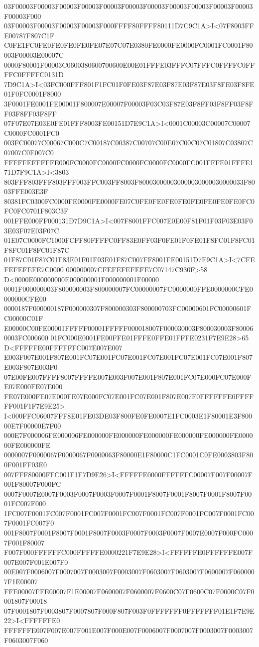 03F00003F00003F00003F00003F00003F00003F00003F00003F00003F00003F00003F00003F000
03F00003F00003F00003F00003F000FFFF80FFFF80111D7C9C1A>I<07F8003FFE00787F807C1F
C0FE1FC0FE0FE0FE0FE0FE07E07C07E0380FE0000FE0000FC0001FC0001F80003F00003E00007C
0000F80001F00003C0600380600700600E00E01FFFE03FFFC07FFFC0FFFFC0FFFFC0FFFFC0131D
7D9C1A>I<03FC000FFF801F1FC01F0FE03F87E03F87E03F87E03F8FE03F8FE01F0FC0001F8000
3F0001FE0001FE00001F800007E00007F00003F03C03F87E03F8FF03F8FF03F8FF03F8FF03F8FF
07F07E07E03E0FE01FFF8003FE00151D7E9C1A>I<0001C00003C00007C00007C0000FC0001FC0
003FC00077C00067C000C7C00187C00387C00707C00E07C00C07C01807C03807C07007C0E007C0
FFFFFEFFFFFE000FC0000FC0000FC0000FC0000FC0000FC001FFFE01FFFE171D7F9C1A>I<3803
803FFF803FFF803FFF003FFC003FF8003F800030000030000030000030000033F8003FFE003E3F
80381FC0300FC0000FE0000FE0000FE07C0FE0FE0FE0FE0FE0FE0FE0FE0FC0FC0FC0701F803C3F
001FFE000FF000131D7D9C1A>I<007F8001FFC007E0E00F81F01F03F03E03F03E03F07E03F07C
01E07C0000FC1000FCFF80FFFFC0FF83E0FF03F0FE01F0FE01F8FC01F8FC01F8FC01F8FC01F87C
01F87C01F87C01F83E01F01F03E01F87C007FF8001FE00151D7E9C1A>I<7CFEFEFEFEFE7C0000
000000007CFEFEFEFEFE7C07147C930F>58 D<0000E000000000E000000001F000000001F00000
0001F000000003F800000003F800000007FC00000007FC0000000FFE0000000CFE0000000CFE00
0000187F000000187F000000307F800000303F800000703FC00000601FC00000601FC00000C01F
E00000C00FE00001FFFFF00001FFFFF000018007F000030003F800030003F800060003FC000600
01FC000E0001FE00FFE01FFFE0FFE01FFFE0231F7E9E28>65 D<FFFFFE00FFFFFFC007E007E007
E003F007E001F807E001FC07E001FC07E001FC07E001FC07E001FC07E001F807E003F807E003F0
07E00FE007FFFF8007FFFFE007E003F007E001F807E001FC07E000FC07E000FE07E000FE07E000
FE07E000FE07E000FE07E000FC07E001FC07E001F807E007F0FFFFFFE0FFFFFF001F1F7E9E25>
I<000FFC06007FFF8E01FE03DE03F800FE0FE0007E1FC0003E1F80001E3F80000E7F00000E7F00
000E7F000006FE000006FE000000FE000000FE000000FE000000FE000000FE000000FE000000FE
0000007F0000067F0000067F0000063F80000E1F80000C1FC0001C0FE0003803F800F001FF03E0
007FFF80000FFC001F1F7D9E26>I<FFFFFE0000FFFFFFC00007F007F00007F001F80007F000FC
0007F0007E0007F0003F0007F0003F0007F0001F8007F0001F8007F0001F8007F0001FC007F000
1FC007F0001FC007F0001FC007F0001FC007F0001FC007F0001FC007F0001FC007F0001FC007F0
001F8007F0001F8007F0001F8007F0003F0007F0003F0007F0007E0007F000FC0007F001F80007
F007F000FFFFFFC000FFFFFE0000221F7E9E28>I<FFFFFFE0FFFFFFE007F007E007F001E007F0
00E007F0006007F0007007F0003007F0003007F0603007F0603007F0600007F0600007F1E00007
FFE00007FFE00007F1E00007F0600007F0600007F0600C07F0600C07F0000C07F0001807F00018
07F0001807F0003807F0007807F000F807F003F0FFFFFFF0FFFFFFF01E1F7E9E22>I<FFFFFFE0
FFFFFFE007F007E007F001E007F000E007F0006007F0007007F0003007F0003007F0603007F060
